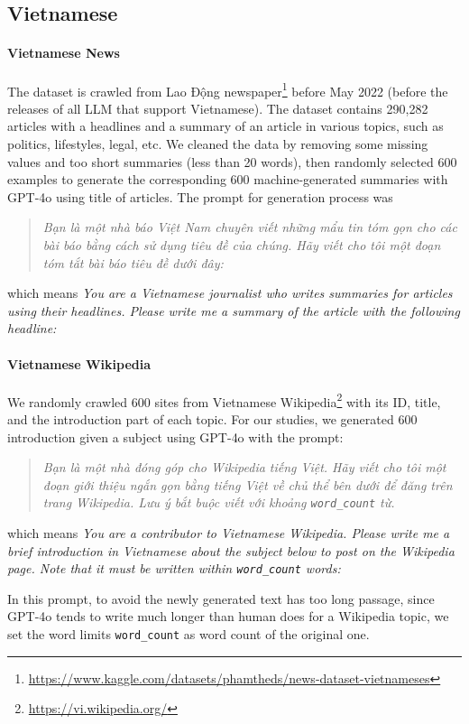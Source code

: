 \subsection{Vietnamese}
\paragraph{Vietnamese News} 
The dataset is crawled from Lao Động newspaper\footnote{\url{https://www.kaggle.com/datasets/phamtheds/news-dataset-vietnameses}} before May 2022 (before the releases of all LLM that support Vietnamese). The dataset contains 290,282 articles with a headlines and a summary of an article in various topics, such as politics, lifestyles, legal, etc. We cleaned the data by removing some missing values and too short summaries (less than 20 words), then randomly selected 600 examples to generate the corresponding 600 machine-generated summaries with GPT-4o using title of articles. The prompt for generation process was
\begin{quote}
    \textit{Bạn là một nhà báo Việt Nam chuyên viết những mẩu tin tóm gọn cho các bài báo bằng cách sử dụng tiêu đề của chúng. Hãy viết cho tôi một đoạn tóm tắt bài báo tiêu đề dưới đây:}
\end{quote}
which means \textit{You are a Vietnamese journalist who writes summaries for articles using their headlines. Please write me a summary of the article with the following headline:} 


\paragraph{Vietnamese Wikipedia} 
We randomly crawled 600 sites from Vietnamese Wikipedia\footnote{\url{https://vi.wikipedia.org/}} with its ID, title, and the introduction part of each topic. For our studies, we generated 600 introduction given a subject using GPT-4o with the prompt:
\begin{quote}
    \textit{Bạn là một nhà đóng góp cho Wikipedia tiếng Việt. Hãy viết cho tôi một đoạn giới thiệu ngắn gọn bằng tiếng Việt về chủ thể bên dưới để đăng trên trang Wikipedia. Lưu ý bắt buộc viết với khoảng \texttt{word\_count} từ.}
\end{quote}
which means \textit{You are a contributor to Vietnamese Wikipedia. Please write me a brief introduction in Vietnamese about the subject below to post on the Wikipedia page. Note that it must be written within \texttt{word\_count} words:}

In this prompt, to avoid the newly generated text has too long passage, since GPT-4o tends to write much longer than human does for a Wikipedia topic, we set the word limits \texttt{word\_count} as word count of the original one.

